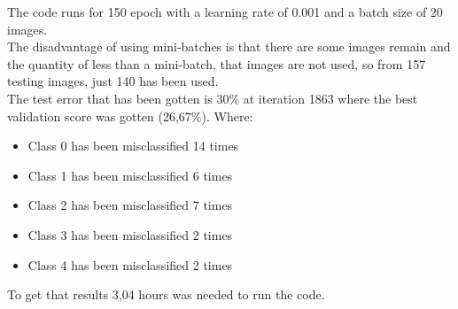 The code runs for 150 epoch with a learning rate of 0.001 and a batch size of 20 images.\\

The disadvantage of using mini-batches is that there are some images remain and the quantity of less than a mini-batch, that images are not used, so from 157 testing images, just 140 has been used.\\

The test error that has been gotten is 30\% at iteration 1863 where the best validation score was gotten (26,67\%). Where:

\begin{itemize}
\item Class 0 has been misclassified  14 times
\item Class 1 has been misclassified  6 times
\item Class 2 has been misclassified  7 times
\item Class 3 has been misclassified  2 times
\item Class 4 has been misclassified  2 times
\end{itemize}

To get that results 3,04 hours was needed to run the code.\\





